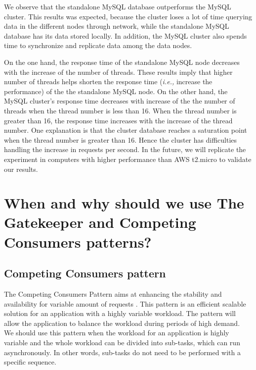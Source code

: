 \documentclass{article}
\begin{document}
We observe that the standalone MySQL database outperforms the MySQL cluster. This results was expected, because the cluster loses a lot of time querying data in the different nodes through network, while the standalone MySQL database has its data stored locally. In addition, the MySQL cluster also spends time to synchronize and replicate data among the data nodes.

On the one hand, the response time of the standalone MySQL node decreases with the increase of the number of threads. These results imply that higher number of threads helps shorten the response time (\emph{i.e.,} increase the performance) of the the standalone MySQL node. On the other hand, the MySQL cluster's response time decreases with increase of the the number of threads when the thread number is less than 16. When the thread number is greater than 16, the response time increases with the increase of the thread number. One explanation is that the cluster database reaches a saturation point when the thread number is greater than 16. Hence the cluster has difficulties handling the increase in requests per second. In the future, we will replicate the experiment in computers with higher performance than AWS t2.micro to validate our results.
  

\section{When and why should we use The Gatekeeper and Competing Consumers patterns?}\label{Q2}
\subsection{Competing Consumers pattern}
The Competing Consumers Pattern aims at enhancing the stability and availability for variable amount of requests \cite{homer2014cloud}. This pattern is an efficient scalable solution for an application with a highly variable workload. The pattern will allow the application to balance the workload during periods of high demand.\\

We should use this pattern when the workload for an application is highly variable and the whole workload can be divided into sub-tasks, which can run asynchronously. In other words, sub-tasks do not need to be performed with a specific sequence. \cite{homer2014cloud}\\
\end{document}
